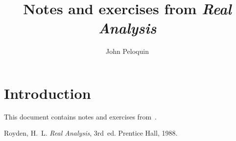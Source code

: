 \documentclass[letterpaper,12pt]{article}
\title{Notes and exercises from \textit{Real Analysis}}
\author{John Peloquin}
\date{}
\theoremstyle{plain}
\theoremstyle{definition}
\theoremstyle{remark}
\begin{document}
\maketitle

\section*{Introduction}
This document contains notes and exercises from~\cite{royden}.

\begin{thebibliography}{0}
 Royden, H.~L. \textit{Real Analysis}, 3rd~ed. Prentice Hall, 1988.
\end{thebibliography}
\end{document}
